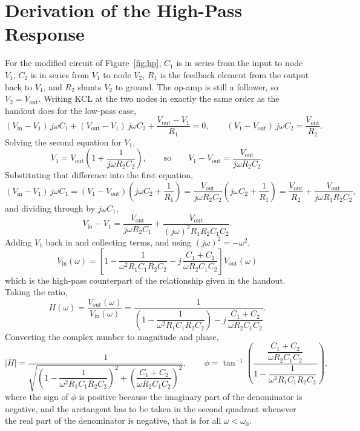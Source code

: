 \documentclass[11pt]{article}
\begin{document}
\section*{Derivation of the High-Pass Response}
For the modified circuit of Figure~\ref{fig:hp}, $C_1$ is in series from the
input to node $V_1$, $C_2$ is in series from $V_1$ to node $V_2$, $R_1$ is the
feedback element from the output back to $V_1$, and $R_2$ shunts $V_2$ to ground.
The op-amp is still a follower, so $V_2 = V_{\text{out}}$. Writing KCL at the two
nodes in exactly the same order as the handout does for the low-pass case,
\[
    (V_{\text{in}} - V_1)\,j\omega C_1
    + (V_{\text{out}} - V_1)\,j\omega C_2
    + \frac{V_{\text{out}} - V_1}{R_1} = 0,
    \qquad
    (V_1 - V_{\text{out}})\,j\omega C_2 = \frac{V_{\text{out}}}{R_2}.
\]
Solving the second equation for $V_1$,
\[
    V_1 = V_{\text{out}}\left(1 + \frac{1}{j\omega R_2C_2}\right),
    \qquad\text{so}\qquad
    V_1 - V_{\text{out}} = \frac{V_{\text{out}}}{j\omega R_2C_2}.
\]
Substituting that difference into the first equation,
\[
    (V_{\text{in}} - V_1)\,j\omega C_1
    = (V_1 - V_{\text{out}})\left(j\omega C_2 + \frac{1}{R_1}\right)
    = \frac{V_{\text{out}}}{j\omega R_2 C_2}\left(j\omega C_2 + \frac{1}{R_1}\right)
    = \frac{V_{\text{out}}}{R_2} + \frac{V_{\text{out}}}{j\omega R_1R_2C_2},
\]
and dividing through by $j\omega C_1$,
\[
    V_{\text{in}} - V_1
    = \frac{V_{\text{out}}}{j\omega R_2C_1}
    + \frac{V_{\text{out}}}{(j\omega)^{2}R_1R_2C_1C_2} .
\]
Adding $V_1$ back in and collecting terms, and using $(j\omega)^2 = -\omega^2$,
\[
    \boxed{\;
    V_{\text{in}}(\omega) =
    \left[1 - \frac{1}{\omega^{2}R_1C_1R_2C_2}
    - j\,\frac{C_1+C_2}{\omega R_2 C_1 C_2}\right] V_{\text{out}}(\omega)
    \;}
\]
which is the high-pass counterpart of the relationship given in the handout.
Taking the ratio,
\[
    H(\omega) = \frac{V_{\text{out}}(\omega)}{V_{\text{in}}(\omega)}
    = \frac{1}{\left(1 - \dfrac{1}{\omega^{2}R_1C_1R_2C_2}\right)
    - j\,\dfrac{C_1+C_2}{\omega R_2C_1C_2}} .
\]
Converting the complex number to magnitude and phase,
\[
    |H| = \frac{1}
    {\sqrt{\left(1-\dfrac{1}{\omega^{2}R_1C_1R_2C_2}\right)^{2}
    + \left(\dfrac{C_1+C_2}{\omega R_2C_1C_2}\right)^{2}}},
    \qquad
    \phi = \tan^{-1}\!\left(
    \frac{\dfrac{C_1+C_2}{\omega R_2C_1C_2}}
         {1-\dfrac{1}{\omega^{2}R_1C_1R_2C_2}}\right),
\]
where the sign of $\phi$ is positive because the imaginary part of the
denominator is negative, and the arctangent has to be taken in the second
quadrant whenever the real part of the denominator is negative, that is for all
$\omega < \omega_0$.
\end{document}
